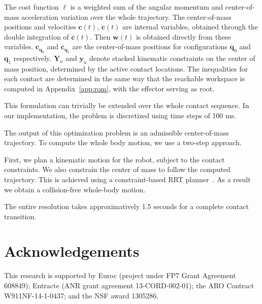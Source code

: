 \documentclass[journal]{IEEEtran}
\begin{document}
The cost function $\ell$ is a weighted sum of the angular momentum and center-of-mass acceleration variation over the whole trajectory.
The center-of-mass positions and velocities $\mathbf{c}(t)$, $\mathbf{\dot{c}}(t)$ are internal variables, obtained through the double integration of $\mathbf{\ddot{c}}(t)$.
Then $\mathbf{w}(t)$ is obtained directly from these variables. $\mathbf{c}_{\mathbf{q}_0}$ and $\mathbf{c}_{\mathbf{q}_1}$ are the center-of-mass positions for configurations
 $\mathbf{q}_0$ and $\mathbf{q}_1$ respectively.
$\mathbf{Y}_u$ and $\mathbf{y}_u$ denote stacked kinematic constraints on the center of mass position, determined by the active contact locations.
The inequalities for each contact are determined in the same way that the reachable workspace is computed in Appendix~\ref{app:rom}, with
the effector serving as root. %

This formulation can trivially be extended over the whole contact sequence.
In our implementation, the problem is discretized using time steps of 100 ms. 

The output of this optimization problem is an admissible center-of-mass trajectory.
To compute the whole body motion, we use a two-step approach.

First, we plan a kinematic motion for the robot, subject to the contact constraints. We also constrain the center of mass to follow
the computed trajectory. This is achieved using a constraint-based RRT planner~\citep{7759083}. As a result we obtain a collision-free whole-body motion.

The entire resolution takes approximatively 1.5 seconds for a complete contact transition.



\section*{Acknowledgements}
This research is supported by Euroc (project under FP7 Grant Agreement  608849);  Entracte (ANR  grant  agreement  13-CORD-002-01);
the ARO Contract W911NF-14-1-0437; and the NSF award 1305286. %
\end{document}
